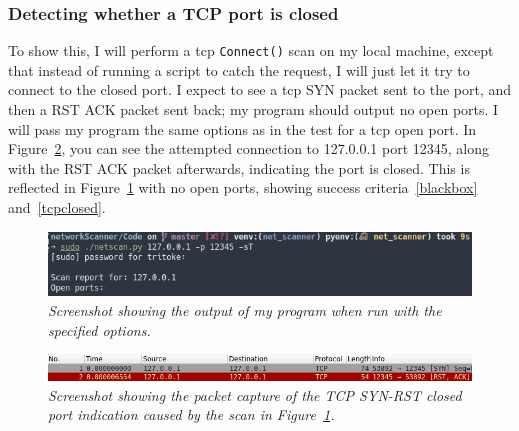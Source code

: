 \documentclass[titlepage]{article}
\let\Oldsubsubsection\subsubsection{}
\renewcommand{\subsubsection}{\FloatBarrier\Oldsubsubsection}
\begin{document}
\subsubsection{Detecting whether a TCP port is closed}\label{test:tcpclosed}
To show this, I will perform a \gls{tcp} \verb|Connect()| scan
on my local machine, except that instead of running a script to catch the
request, I will just let it try to connect to the closed port.
I expect to see a \gls{tcp} SYN packet sent to the port, and then a RST ACK
packet sent back; my program should output no open ports.
I will pass my program the same options as in the test for
a \gls{tcp} open port.
In Figure~\ref{tcpclosedpcap}, you can see the attempted connection to
127.0.0.1 port 12345, along with the RST ACK packet afterwards, indicating
the port is closed. This is reflected in Figure~\ref{tcpclosedoutput}
with no open ports, showing success criteria~\ref{blackbox} and~\ref{tcpclosed}.
\begin{figure}[H]
  \centering
  \includegraphics[width=\textwidth]{tcpclosedoutput.png}
  \caption{\textit{%
    Screenshot showing the output of my program when run with the specified options.
}}\label{tcpclosedoutput}
\end{figure}

\begin{figure}[H]
  \centering
  \includegraphics[width=\textwidth]{tcpclosedpcap.png}
  \caption{\textit{%
    Screenshot showing the packet capture of the TCP SYN-RST closed port indication
    caused by the scan in Figure~\ref{tcpclosedoutput}.
}}\label{tcpclosedpcap}
\end{figure}
\end{document}
